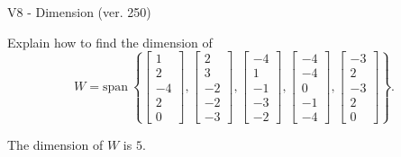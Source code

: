 \begin{exercise}
  \begin{exerciseTitle}V8 - Dimension (ver. 250)\end{exerciseTitle}
  \begin{exerciseStatement}
    Explain how to find the dimension of 
\[W=\mathrm{span}\ \left\{\left[\begin{array}{r}
1 \\
2 \\
-4 \\
2 \\
0
\end{array}\right] , \left[\begin{array}{r}
2 \\
3 \\
-2 \\
-2 \\
-3
\end{array}\right] , \left[\begin{array}{r}
-4 \\
1 \\
-1 \\
-3 \\
-2
\end{array}\right] , \left[\begin{array}{r}
-4 \\
-4 \\
0 \\
-1 \\
-4
\end{array}\right] , \left[\begin{array}{r}
-3 \\
2 \\
-3 \\
2 \\
0
\end{array}\right]\right\}.\]



  \end{exerciseStatement}
  \begin{exerciseAnswer}
   The dimension of \(W\) is  \(5\).
  


  \end{exerciseAnswer}
\end{exercise}